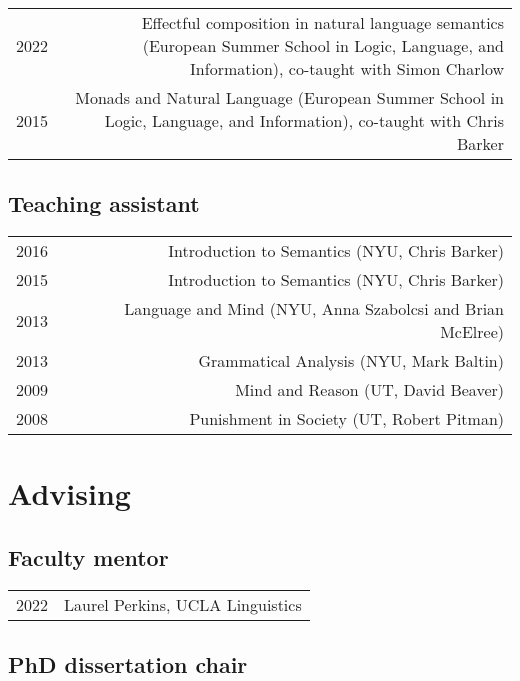 \documentclass[12pt]{article}
\begin{document}
\begin{longtable}{LR}
  2022 & Effectful composition in natural language semantics (European Summer
         School in Logic, Language, and Information), co-taught with Simon
         Charlow\\
  2015 & Monads and Natural Language (European Summer School in Logic, Language,
         and Information), co-taught with Chris Barker
\end{longtable}

\subsection*{Teaching assistant}

\begin{longtable}{LR}
  2016 & Introduction to Semantics (NYU, Chris Barker)
         \\
  2015 & Introduction to Semantics (NYU, Chris Barker)
         \\
  2013 & Language and Mind (NYU, Anna Szabolcsi and Brian McElree)
         \\
  2013 & Grammatical Analysis (NYU, Mark Baltin)
         \\
  2009 & Mind and Reason (UT, David Beaver)
         \\
  2008 & Punishment in Society (UT, Robert Pitman)
\end{longtable}


\medskip

\section*{Advising}

\subsection*{Faculty mentor}

\begin{longtable}{LR}
  2022    & Laurel Perkins, UCLA Linguistics
\end{longtable}

\subsection*{PhD dissertation chair}
\end{document}
